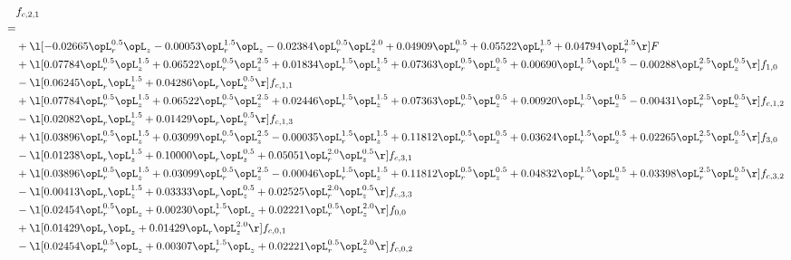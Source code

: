 \begin{alignat}{2} 
\label{eq:f_21_1} 
& f_{c,2,1} \nonumber \\ 
 = \\ 
& + \l[  -0.02665 \opL_r^{0.5} \opL_z   -0.00053 \opL_r^{1.5} \opL_z   -0.02384 \opL_r^{0.5} \opL_z^{2.0} +  0.04909 \opL_r^{0.5} +  0.05522 \opL_r^{1.5} +  0.04794 \opL_r^{2.5}  \r] F \nonumber \\ 
& + \l[  0.07784 \opL_r^{0.5} \opL_z^{1.5} +  0.06522 \opL_r^{0.5} \opL_z^{2.5} +  0.01834 \opL_r^{1.5} \opL_z^{1.5} +  0.07363 \opL_r^{0.5} \opL_z^{0.5} +  0.00690 \opL_r^{1.5} \opL_z^{0.5}   -0.00288 \opL_r^{2.5} \opL_z^{0.5}  \r] f_{1,0} \nonumber \\ 
& - \l[  0.06245 \opL_r \opL_z^{1.5} +  0.04286 \opL_r \opL_z^{0.5}  \r] f_{c,1,1} \nonumber \\ 
& + \l[  0.07784 \opL_r^{0.5} \opL_z^{1.5} +  0.06522 \opL_r^{0.5} \opL_z^{2.5} +  0.02446 \opL_r^{1.5} \opL_z^{1.5} +  0.07363 \opL_r^{0.5} \opL_z^{0.5} +  0.00920 \opL_r^{1.5} \opL_z^{0.5}   -0.00431 \opL_r^{2.5} \opL_z^{0.5}  \r] f_{c,1,2} \nonumber \\ 
& - \l[  0.02082 \opL_r \opL_z^{1.5} +  0.01429 \opL_r \opL_z^{0.5}  \r] f_{c,1,3} \nonumber \\ 
& + \l[  0.03896 \opL_r^{0.5} \opL_z^{1.5} +  0.03099 \opL_r^{0.5} \opL_z^{2.5}   -0.00035 \opL_r^{1.5} \opL_z^{1.5} +  0.11812 \opL_r^{0.5} \opL_z^{0.5} +  0.03624 \opL_r^{1.5} \opL_z^{0.5} +  0.02265 \opL_r^{2.5} \opL_z^{0.5}  \r] f_{3,0} \nonumber \\ 
& - \l[  0.01238 \opL_r \opL_z^{1.5} +  0.10000 \opL_r \opL_z^{0.5} +  0.05051 \opL_r^{2.0} \opL_z^{0.5}  \r] f_{c,3,1} \nonumber \\ 
& + \l[  0.03896 \opL_r^{0.5} \opL_z^{1.5} +  0.03099 \opL_r^{0.5} \opL_z^{2.5}   -0.00046 \opL_r^{1.5} \opL_z^{1.5} +  0.11812 \opL_r^{0.5} \opL_z^{0.5} +  0.04832 \opL_r^{1.5} \opL_z^{0.5} +  0.03398 \opL_r^{2.5} \opL_z^{0.5}  \r] f_{c,3,2} \nonumber \\ 
& - \l[  0.00413 \opL_r \opL_z^{1.5} +  0.03333 \opL_r \opL_z^{0.5} +  0.02525 \opL_r^{2.0} \opL_z^{0.5}  \r] f_{c,3,3} \nonumber \\ 
& - \l[  0.02454 \opL_r^{0.5} \opL_z +  0.00230 \opL_r^{1.5} \opL_z +  0.02221 \opL_r^{0.5} \opL_z^{2.0}  \r] f_{0,0} \nonumber \\ 
& + \l[  0.01429 \opL_r \opL_z +  0.01429 \opL_r \opL_z^{2.0}  \r] f_{c,0,1} \nonumber \\ 
& - \l[  0.02454 \opL_r^{0.5} \opL_z +  0.00307 \opL_r^{1.5} \opL_z +  0.02221 \opL_r^{0.5} \opL_z^{2.0}  \r] f_{c,0,2} \nonumber \\ 

\end{alignat}
